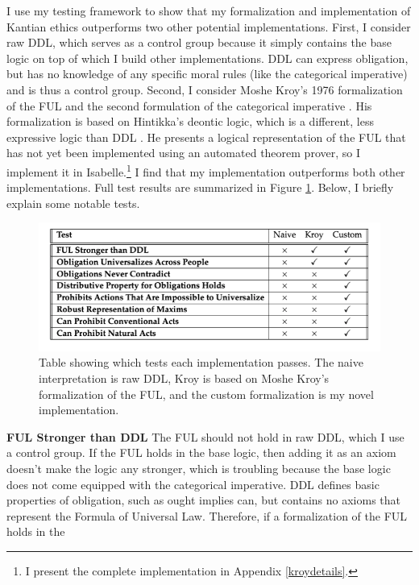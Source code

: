 \begin{isabellebody}
\begin{isamarkuptext}
I use my testing framework to show that my formalization and implementation of Kantian ethics outperforms 
two other potential implementations. First, I consider raw DDL, which serves as a control group because it simply contains the base logic
on top of which I build other implementations. DDL can express obligation, but has no knowledge of any 
specific moral rules (like the categorical imperative) and is thus a 
control group. Second, I consider Moshe Kroy's 1976 formalization of the FUL and the second formulation
of the categorical imperative \citep{kroy}. His formalization is based on Hintikka's deontic logic, which is a different,
less expressive logic than DDL \citep{hintikka}. He presents a logical representation of the FUL that has not yet been implemented
using an automated theorem prover, so I implement it in Isabelle.\footnote{I present the complete implementation in
Appendix \ref{kroydetails}.} I find that my implementation outperforms 
both other implementations. Full test results are summarized in Figure \ref{table}. Below, I briefly 
explain some notable tests.%
\end{isamarkuptext}\isamarkuptrue%
%
\begin{figure}
\centering
\includegraphics[scale=0.6]{goalstable.png}
\caption{Table showing which tests each implementation passes. The naive interpretation is raw DDL, 
Kroy is based on Moshe Kroy's formalization of the FUL, and the custom formalization is my novel implementation.} \label{table}
\end{figure}
%
\begin{isamarkuptext}%
\noindent \textbf{FUL Stronger than DDL} The FUL should not hold in raw DDL, which I use a control group. 
If the FUL holds in the base logic, then adding it as an axiom doesn't make the logic any stronger, 
which is troubling because the base logic does not come equipped with the categorical imperative. DDL
defines basic properties of obligation, such as ought implies can, but contains no axioms that represent
the Formula of Universal Law. Therefore, if a formalization of the FUL holds in the 

\end{isamarkuptext}
\end{isabellebody}

